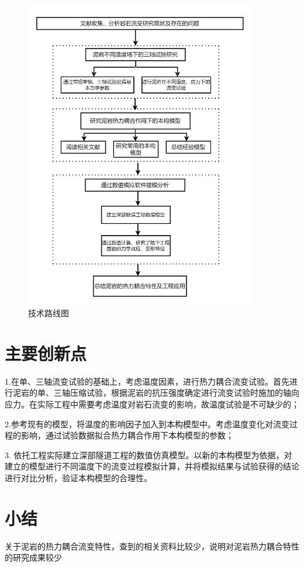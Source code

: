\begin{figure}[ht!]
    \centering
    \includegraphics[width=0.9\textwidth]{img/chap1/技术路线.png}
    \caption{技术路线图}
    \label{fig:1-1}
\end{figure}


\section{主要创新点}

1.在单、三轴流变试验的基础上，考虑温度因素，进行热力耦合流变试验。首先进行泥岩的单、三轴压缩试验，根据泥岩的抗压强度确定进行流变试验时施加的轴向应力。在实际工程中需要考虑温度对岩石流变的影响，故温度试验是不可缺少的；

2.参考现有的模型，将温度的影响因子加入到本构模型中。考虑温度变化对流变过程的影响，通过试验数据拟合热力耦合作用下本构模型的参数；

3. 依托工程实际建立深部隧道工程的数值仿真模型。以新的本构模型为依据，对建立的模型进行不同温度下的流变过程模拟计算，并将模拟结果与试验获得的结论进行对比分析，验证本构模型的合理性。


\section{小结}

关于泥岩的热力耦合流变特性，查到的相关资料比较少，说明对泥岩热力耦合特性的研究成果较少






